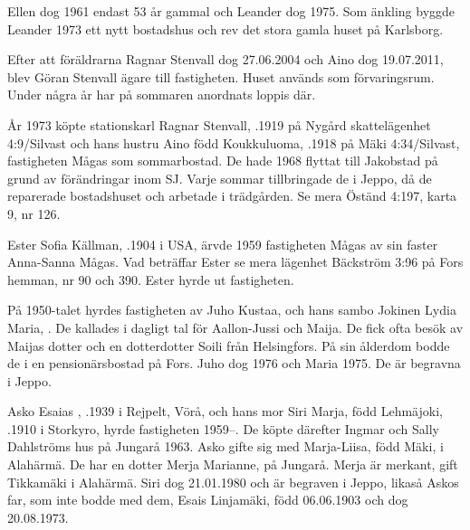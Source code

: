 Ellen dog 1961 endast 53 år gammal och Leander dog 1975. Som änkling byggde Leander 1973 ett nytt bostadshus och rev det stora gamla huset på Karlsborg.





Efter att föräldrarna Ragnar Stenvall dog 27.06.2004 och Aino	dog 19.07.2011, blev Göran Stenvall ägare till fastigheten. Huset används som förvaringsrum. Under några år har på sommaren anordnats loppis där.



År 1973 köpte stationskarl Ragnar Stenvall, .1919 på Nygård skattelägenhet 4:9/Silvast och hans hustru Aino född	Koukkuluoma, .1918 på Mäki 4:34/Silvast, fastigheten Mågas som sommarbostad. De hade 1968 flyttat till Jakobstad på grund av förändringar inom SJ. Varje sommar tillbringade de i Jeppo, då de reparerade bostadshuset och arbetade i trädgården. Se mera Öständ 4:197, karta 9, nr 126.


Ester Sofia Källman, .1904 i USA, ärvde 1959 fastigheten Mågas av sin faster Anna-Sanna Mågas. Vad beträffar Ester se mera lägenhet Bäckström 3:96 på Fors hemman, nr 90 och 390. Ester hyrde ut fastigheten.



På 1950-talet hyrdes fastigheten av  Juho Kustaa,  och hans sambo Jokinen Lydia Maria, . De kallades i dagligt tal för Aallon-Jussi och Maija. De fick ofta besök av Maijas dotter och en dotterdotter Soili från Helsingfors. På sin ålderdom bodde de i en pensionärsbostad på Fors. Juho dog 1976 och Maria 1975. De är 	begravna i Jeppo.

Asko Esaias , .1939 i Rejpelt, Vörå, och hans mor Siri Marja, född Lehmäjoki, .1910 i Storkyro, hyrde fastigheten 1959--. De köpte därefter Ingmar och Sally Dahlströms hus på Jungarå 1963.	Asko gifte sig med Marja-Liisa, född Mäki,  i Alahärmä. De har en dotter Merja Marianne,  på Jungarå. Merja är merkant, gift Tikkamäki i Alahärmä. Siri dog 21.01.1980 och är begraven i Jeppo, likaså Askos far, som inte bodde med dem, Esais Linjamäki, född 06.06.1903 och dog 20.08.1973.



